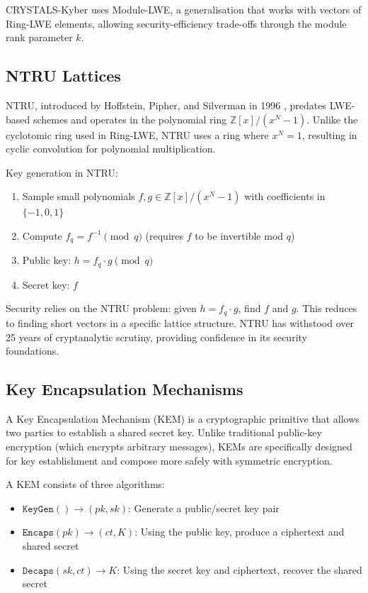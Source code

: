 \documentclass[11pt,a4paper]{article}
\begin{document}
CRYSTALS-Kyber uses Module-LWE, a generalisation that works with vectors of Ring-LWE elements, allowing security-efficiency trade-offs through the module rank parameter $k$.

\subsection{NTRU Lattices}

NTRU, introduced by Hoffstein, Pipher, and Silverman in 1996 \cite{hoffstein1998}, predates LWE-based schemes and operates in the polynomial ring $\mathbb{Z}[x]/(x^N - 1)$. Unlike the cyclotomic ring used in Ring-LWE, NTRU uses a ring where $x^N = 1$, resulting in cyclic convolution for polynomial multiplication.

Key generation in NTRU:
\begin{enumerate}
    \item Sample small polynomials $f, g \in \mathbb{Z}[x]/(x^N - 1)$ with coefficients in $\{-1, 0, 1\}$
    \item Compute $f_q = f^{-1} \pmod{q}$ (requires $f$ to be invertible mod $q$)
    \item Public key: $h = f_q \cdot g \pmod{q}$
    \item Secret key: $f$
\end{enumerate}

Security relies on the NTRU problem: given $h = f_q \cdot g$, find $f$ and $g$. This reduces to finding short vectors in a specific lattice structure. NTRU has withstood over 25 years of cryptanalytic scrutiny, providing confidence in its security foundations.

\subsection{Key Encapsulation Mechanisms}

A Key Encapsulation Mechanism (KEM) is a cryptographic primitive that allows two parties to establish a shared secret key. Unlike traditional public-key encryption (which encrypts arbitrary messages), KEMs are specifically designed for key establishment and compose more safely with symmetric encryption.

A KEM consists of three algorithms:
\begin{itemize}
    \item $\texttt{KeyGen}() \rightarrow (pk, sk)$: Generate a public/secret key pair
    \item $\texttt{Encaps}(pk) \rightarrow (ct, K)$: Using the public key, produce a ciphertext and shared secret
    \item $\texttt{Decaps}(sk, ct) \rightarrow K$: Using the secret key and ciphertext, recover the shared secret
\end{itemize}
\end{document}
